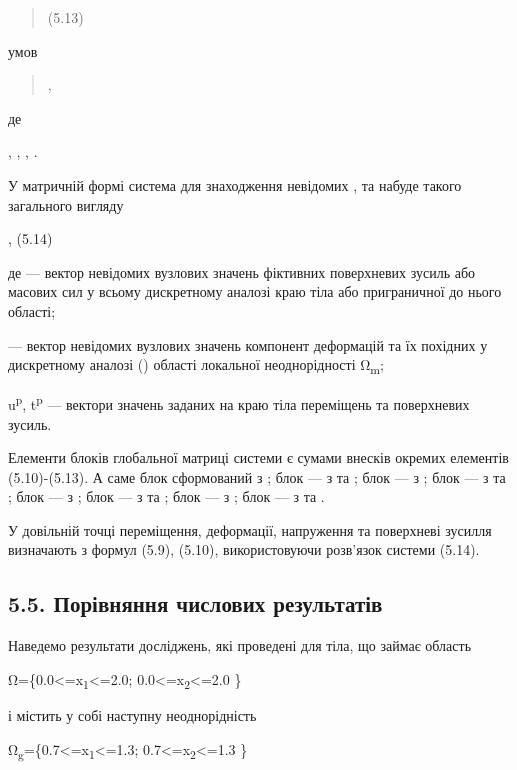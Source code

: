 \begin{quote}
(5.13)
\end{quote}

умов

\begin{quote}
,
\end{quote}

де

, , , .

У матричній формі система для знаходження невідомих , та набуде такого
загального вигляду

, (5.14)

де --- вектор невідомих вузлових значень фіктивних поверхневих зусиль
або масових сил у всьому дискретному аналозі краю тіла або приграничної
до нього області;

--- вектор невідомих вузлових значень компонент деформацій та їх
похідних у дискретному аналозі () області локальної неоднорідності
Ω\textsubscript{m};

u\textsuperscript{p}, t\textsuperscript{p} --- вектори значень заданих
на краю тіла переміщень та поверхневих зусиль.

Елементи блоків глобальної матриці системи є сумами внесків окремих
елементів (5.10)-(5.13). А саме блок сформований з ; блок --- з та ;
блок --- з ; блок --- з та ; блок --- з ; блок --- з та ; блок --- з ;
блок --- з та .

У довільній точці переміщення, деформації, напруження та поверх­неві
зусилля визначають з формул (5.9), (5.10), використовуючи розв'язок
системи (5.14).

\hypertarget{ux43fux43eux440ux456ux432ux43dux44fux43dux43dux44f-ux447ux438ux441ux43bux43eux432ux438ux445-ux440ux435ux437ux443ux43bux44cux442ux430ux442ux456ux432-1}{%
\subsection{5.5. Порівняння числових
результатів}\label{ux43fux43eux440ux456ux432ux43dux44fux43dux43dux44f-ux447ux438ux441ux43bux43eux432ux438ux445-ux440ux435ux437ux443ux43bux44cux442ux430ux442ux456ux432-1}}

Наведемо результати досліджень, які проведені для тіла, що займає
область

Ω=\{0.0\textless=x\textsubscript{1}\textless=2.0;
0.0\textless=x\textsubscript{2}\textless=2.0 \}

і містить у собі наступну неоднорідність

Ω\textsubscript{g}=\{0.7\textless=x\textsubscript{1}\textless=1.3;
0.7\textless=x\textsubscript{2}\textless=1.3 \}

